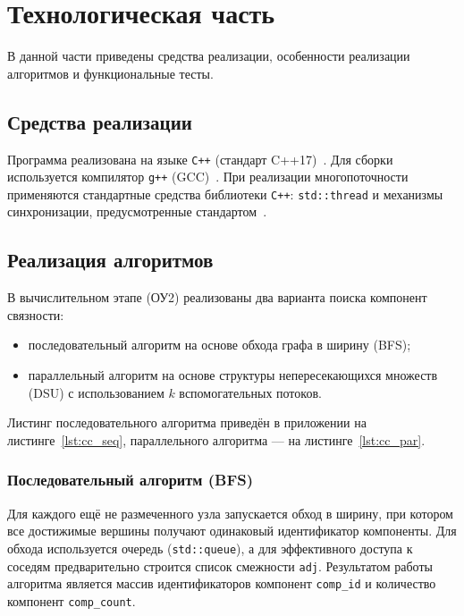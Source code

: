\chapter{Технологическая часть}

В данной части приведены средства реализации, особенности реализации алгоритмов и функциональные тесты.

\section{Средства реализации}

Программа реализована на языке \texttt{C++} (стандарт C++17)~\cite{cpp_standard}.
Для сборки используется компилятор \texttt{g++} (GCC)~\cite{gcc}.
При реализации многопоточности применяются стандартные средства библиотеки \texttt{C++}: \texttt{std::thread} и механизмы синхронизации, предусмотренные стандартом~\cite{cpp_standard}.

\section{Реализация алгоритмов}

В вычислительном этапе (ОУ2) реализованы два варианта поиска компонент связности:
\begin{itemize}
	\item последовательный алгоритм на основе обхода графа в ширину (BFS);
	\item параллельный алгоритм на основе структуры непересекающихся множеств (DSU) с использованием $k$ вспомогательных потоков.
\end{itemize}

Листинг последовательного алгоритма приведён в приложении на листинге~\ref{lst:cc_seq}, параллельного алгоритма --- на листинге~\ref{lst:cc_par}.

\subsection{Последовательный алгоритм (BFS)}

Для каждого ещё не размеченного узла запускается обход в ширину, при котором все достижимые вершины получают одинаковый идентификатор компоненты.
Для обхода используется очередь (\texttt{std::queue}), а для эффективного доступа к соседям предварительно строится список смежности \texttt{adj}.
Результатом работы алгоритма является массив идентификаторов компонент \texttt{comp\_id} и количество компонент \texttt{comp\_count}.

